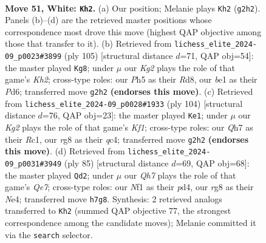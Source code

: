 \documentclass[11pt]{article}
\begin{document}
\clearpage

\begin{figure}[p]\centering
\begin{subfigure}{0.46\textwidth}\centering
\resizebox{\linewidth}{!}{%
\newchessgame
\chessboard[
  setfen={r5r1/pk4pQ/7p/3p3P/pq1P2P1/4P3/6K1/4bN2 w - - 10 51},
  showmover=false,
  pgfstyle=straightmove, color=movearrow, markmove={g2-h2}
]}
\caption{}
\end{subfigure}\hfill
\begin{subfigure}{0.46\textwidth}\centering
\resizebox{\linewidth}{!}{%
\newchessgame
\chessboard[
  setfen={3r4/1p3p1k/1P1p2p1/p2P3p/P1P5/2Q1R2P/5qPK/8 b - - 15 53},
  showmover=false,
  pgfstyle=straightmove, color=movearrow, markmove={h7-g8}
]}
\caption{}
\end{subfigure}
\\[4pt]
\begin{subfigure}{0.46\textwidth}\centering
\resizebox{\linewidth}{!}{%
\newchessgame
\chessboard[
  setfen={4Q3/1p4pk/1b5p/7P/p1q4r/5P2/2p3P1/2R2K2 w - - 5 53},
  showmover=false,
  pgfstyle=straightmove, color=movearrow, markmove={f1-e1}
]}
\caption{}
\end{subfigure}\hfill
\begin{subfigure}{0.46\textwidth}\centering
\resizebox{\linewidth}{!}{%
\newchessgame
\chessboard[
  setfen={8/1p5k/6p1/P2p1p2/3PnQ2/4P2P/4q1PB/5R1K b - - 2 43},
  showmover=false,
  pgfstyle=straightmove, color=movearrow, markmove={e2-d2}
]}
\caption{}
\end{subfigure}
\caption{\textbf{Move 51, White: \texttt{Kh2}.} (a) Our position; Melanie plays \texttt{Kh2} (\texttt{g2h2}). Panels (b)--(d) are the retrieved master positions whose correspondence most drove this move (highest QAP objective among those that transfer to it). (b) Retrieved from \texttt{lichess\_elite\_2024-09\_p0023\#3899} (ply 105) [structural distance $d$=71, QAP obj=54]: the master played \texttt{Kg8}; under $\mu$ our \emph{Kg2} plays the role of that game's \emph{Kh2}; cross-type roles: our \emph{P}h5 as their \emph{R}d8, our \emph{b}e1 as their \emph{P}d6; transferred move \texttt{g2h2} \textbf{(endorses this move)}. (c) Retrieved from \texttt{lichess\_elite\_2024-09\_p0028\#1933} (ply 104) [structural distance $d$=76, QAP obj=23]: the master played \texttt{Ke1}; under $\mu$ our \emph{Kg2} plays the role of that game's \emph{Kf1}; cross-type roles: our \emph{Q}h7 as their \emph{R}c1, our \emph{r}g8 as their \emph{q}c4; transferred move \texttt{g2h2} \textbf{(endorses this move)}. (d) Retrieved from \texttt{lichess\_elite\_2024-09\_p0031\#3949} (ply 85) [structural distance $d$=69, QAP obj=68]: the master played \texttt{Qd2}; under $\mu$ our \emph{Qh7} plays the role of that game's \emph{Qe7}; cross-type roles: our \emph{N}f1 as their \emph{p}d4, our \emph{r}g8 as their \emph{N}e4; transferred move \texttt{h7g8}. Synthesis: 2 retrieved analogs transferred to \texttt{Kh2} (summed QAP objective 77, the strongest correspondence among the candidate moves); Melanie committed it via the \texttt{search} selector.}
\label{fig:thought-m100}
\end{figure}
\end{document}
